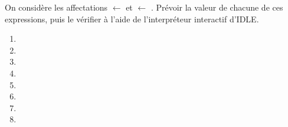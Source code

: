 On considère les affectations  $\leftarrow$  et  $\leftarrow$ .
Prévoir la valeur de chacune de ces expressions, puis le vérifier à l'aide de l'interpréteur interactif d'IDLE.

\begin{multicols}{2}
  \begin{enumerate}[label=\emph{\alph*)}]
    \item {}
    \item {}
    \item {}
    \item {}
    \item {}
    \item {}
    \item {}
    \item {}
  \end{enumerate}
\end{multicols}